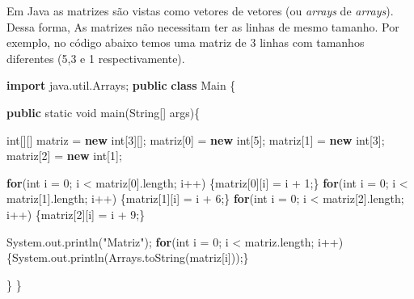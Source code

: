 \documentclass[
]{book}
\newenvironment{Shaded}{\begin{snugshade}}{\end{snugshade}}
\newcommand{\BuiltInTok}[1]{#1}
\newcommand{\DataTypeTok}[1]{\textcolor[rgb]{0.13,0.29,0.53}{#1}}
\newcommand{\DecValTok}[1]{\textcolor[rgb]{0.00,0.00,0.81}{#1}}
\newcommand{\FunctionTok}[1]{\textcolor[rgb]{0.00,0.00,0.00}{#1}}
\newcommand{\ImportTok}[1]{#1}
\newcommand{\KeywordTok}[1]{\textcolor[rgb]{0.13,0.29,0.53}{\textbf{#1}}}
\newcommand{\NormalTok}[1]{#1}
\newcommand{\StringTok}[1]{\textcolor[rgb]{0.31,0.60,0.02}{#1}}
\begin{document}
Em Java as matrizes são vistas como vetores de vetores (ou \emph{arrays} de \emph{arrays}). Dessa forma, As matrizes não necessitam ter as linhas de mesmo tamanho. Por exemplo, no código abaixo temos uma matriz de 3 linhas com tamanhos diferentes (5,3 e 1 respectivamente).

\begin{Shaded}
\begin{Highlighting}[]
\KeywordTok{import}\ImportTok{ java.util.Arrays;}
\KeywordTok{public} \KeywordTok{class}\NormalTok{ Main \{}

    \KeywordTok{public} \DataTypeTok{static} \DataTypeTok{void} \FunctionTok{main}\NormalTok{(}\BuiltInTok{String}\NormalTok{[] args)\{}
        
        \DataTypeTok{int}\NormalTok{[][] matriz = }\KeywordTok{new} \DataTypeTok{int}\NormalTok{[}\DecValTok{3}\NormalTok{][];}
\NormalTok{        matriz[}\DecValTok{0}\NormalTok{] = }\KeywordTok{new} \DataTypeTok{int}\NormalTok{[}\DecValTok{5}\NormalTok{];}
\NormalTok{        matriz[}\DecValTok{1}\NormalTok{] = }\KeywordTok{new} \DataTypeTok{int}\NormalTok{[}\DecValTok{3}\NormalTok{];}
\NormalTok{        matriz[}\DecValTok{2}\NormalTok{] = }\KeywordTok{new} \DataTypeTok{int}\NormalTok{[}\DecValTok{1}\NormalTok{];}

        \KeywordTok{for}\NormalTok{(}\DataTypeTok{int}\NormalTok{ i = }\DecValTok{0}\NormalTok{; i < matriz[}\DecValTok{0}\NormalTok{].}\FunctionTok{length}\NormalTok{; i++) \{matriz[}\DecValTok{0}\NormalTok{][i] = i + }\DecValTok{1}\NormalTok{;\}}
        \KeywordTok{for}\NormalTok{(}\DataTypeTok{int}\NormalTok{ i = }\DecValTok{0}\NormalTok{; i < matriz[}\DecValTok{1}\NormalTok{].}\FunctionTok{length}\NormalTok{; i++) \{matriz[}\DecValTok{1}\NormalTok{][i] = i + }\DecValTok{6}\NormalTok{;\}}
        \KeywordTok{for}\NormalTok{(}\DataTypeTok{int}\NormalTok{ i = }\DecValTok{0}\NormalTok{; i < matriz[}\DecValTok{2}\NormalTok{].}\FunctionTok{length}\NormalTok{; i++) \{matriz[}\DecValTok{2}\NormalTok{][i] = i + }\DecValTok{9}\NormalTok{;\}}

        \BuiltInTok{System}\NormalTok{.}\FunctionTok{out}\NormalTok{.}\FunctionTok{println}\NormalTok{(}\StringTok{"Matriz"}\NormalTok{);}
        \KeywordTok{for}\NormalTok{(}\DataTypeTok{int}\NormalTok{ i = }\DecValTok{0}\NormalTok{; i < matriz.}\FunctionTok{length}\NormalTok{; i++) \{}\BuiltInTok{System}\NormalTok{.}\FunctionTok{out}\NormalTok{.}\FunctionTok{println}\NormalTok{(}\BuiltInTok{Arrays}\NormalTok{.}\FunctionTok{toString}\NormalTok{(matriz[i]));\}}

\NormalTok{    \}}
\NormalTok{\}}
\end{Highlighting}
\end{Shaded}
\end{document}
